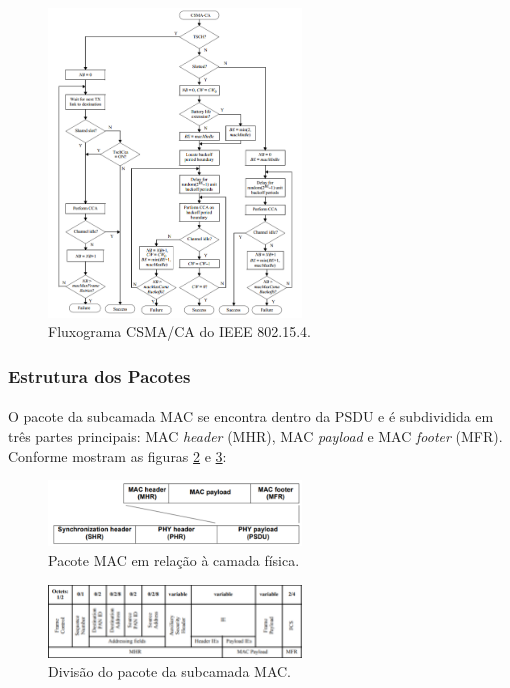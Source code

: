 \begin{figure}[!ht]
	\centering
	\includegraphics[width=0.6\textwidth]{Figuras/fluxograma_CSMA.PNG}   
	\caption{Fluxograma CSMA/CA do IEEE 802.15.4. \citep{IEEE2015}}
	\label{fig:figura9}
\end{figure}


\newpage
\subsubsection{Estrutura dos Pacotes}
\paragraph{} O pacote da subcamada MAC se encontra dentro da PSDU e é subdividida em três partes principais: MAC \textit{header} (MHR), MAC \textit{payload} e MAC \textit{footer} (MFR). Conforme mostram as figuras \ref{fig:figura10} e \ref{fig:figura11}:


\begin{figure}[!ht]
    \centering
    \includegraphics[width=0.6\textwidth]{Figuras/MAC1.PNG}
    \caption{Pacote MAC em relação à camada física. \citep{IEEE2015}}
    \label{fig:figura10}
\end{figure}
    
\begin{figure}[!ht]
    \centering
    \includegraphics[width=0.6\textwidth]{Figuras/MAC2.PNG}
    \caption{Divisão do pacote da subcamada MAC. \citep{IEEE2015}}
    \label{fig:figura11}
\end{figure}

